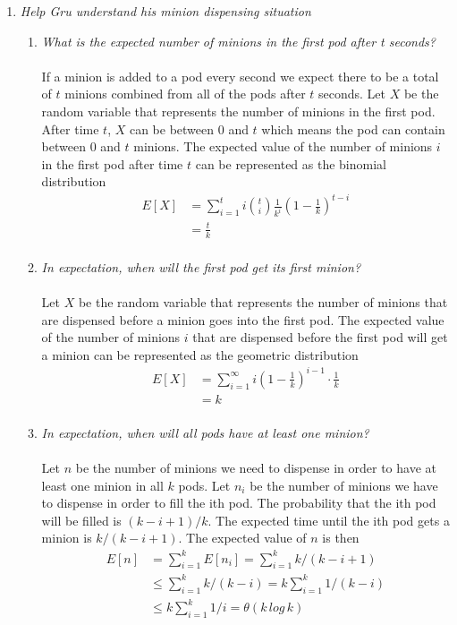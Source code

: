 \documentclass[12pt]{article}
\begin{document}
\begin{enumerate}
		\newpage
		\item \textit{Help Gru understand his minion dispensing situation}
		\begin{enumerate}
		    \item \textit{What is the expected number of minions in the first pod after t seconds?}\\
		    \\
		    If a minion is added to a pod every second we expect there to be a total of $t$ minions combined from all of the pods after $t$ seconds.   Let $X$ be the random variable that represents the number of minions in the first pod.  After time $t$, $X$ can be between 0 and $t$ which means the pod can contain between 0 and $t$ minions.  The expected value of the number of minions $i$ in the first pod after time $t$ can be represented as the binomial distribution \cite{2}
		    \begin{align*}
		    E[X] &= \sum_{i=1}^{t} i\binom{t}{i}\frac{1}{k^i}(1-\frac{1}{k})^{t-i}\\
		    &=\frac{t}{k}\\
		    \end{align*}
		    \item \textit{In expectation, when will the first pod get its first minion?}\\
		    \\
		    Let $X$ be the random variable that represents the number of minions that are dispensed before a minion goes into the first pod.  The expected value of the number of minions $i$ that are dispensed before the first pod will get a minion can be represented as the geometric distribution \cite{3}
		    \begin{align*}
		    E[X] &= \sum_{i=1}^{\infty} i(1-\frac{1}{k})^{i-1} \cdot \frac{1}{k}\\
		    &= k\\
		    \end{align*}
		    
		    \item \textit{In expectation, when will all pods have at least one minion?}\\
		    \\
		    Let $n$ be the number of minions we need to dispense in order to have at least one minion in all $k$ pods.  Let $n_i$ be the number of minions we have to dispense in order to fill the ith pod.  The probability that the ith pod will be filled is $(k-i+1)/k$.  The expected time until the ith pod gets a minion is $k/(k-i+1)$. The expected value of $n$ is then \cite{4}
		    \begin{align*}
		        E[n] &= \sum_{i=1}^{k} E[n_i]=\sum_{i=1}^{k} k/(k-i+1)\\
		        &\le \sum_{i=1}^{k} k/(k-i)=k\sum_{i=1}^{k} 1/(k-i)\\
		        &\le k\sum_{i=1}^{k} 1/i=\theta(k\,log\,k)\\
		    \end{align*}


\end{enumerate}
\end{enumerate}
\end{document}

